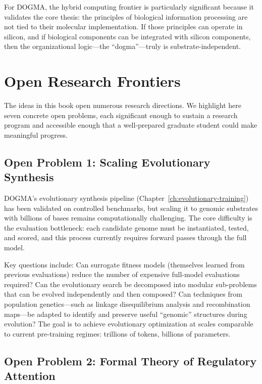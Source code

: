 For DOGMA, the hybrid computing frontier is particularly significant because it validates the core thesis: the principles of biological information processing are not tied to their molecular implementation. If those principles can operate in silicon, and if biological components can be integrated with silicon components, then the organizational logic---the ``dogma''---truly is substrate-independent.

\section{Open Research Frontiers}
\label{sec:open-problems}

The ideas in this book open numerous research directions. We highlight here seven concrete open problems, each significant enough to sustain a research program and accessible enough that a well-prepared graduate student could make meaningful progress.

\subsection{Open Problem 1: Scaling Evolutionary Synthesis}

DOGMA's evolutionary synthesis pipeline (Chapter~\ref{ch:evolutionary-training}) has been validated on controlled benchmarks, but scaling it to genomic substrates with billions of bases remains computationally challenging. The core difficulty is the evaluation bottleneck: each candidate genome must be instantiated, tested, and scored, and this process currently requires forward passes through the full model.

\begin{implnote}
Key questions include: Can surrogate fitness models (themselves learned from previous evaluations) reduce the number of expensive full-model evaluations required? Can the evolutionary search be decomposed into modular sub-problems that can be evolved independently and then composed? Can techniques from population genetics---such as linkage disequilibrium analysis and recombination maps---be adapted to identify and preserve useful ``genomic'' structures during evolution? The goal is to achieve evolutionary optimization at scales comparable to current pre-training regimes: trillions of tokens, billions of parameters.
\end{implnote}

\subsection{Open Problem 2: Formal Theory of Regulatory Attention}

